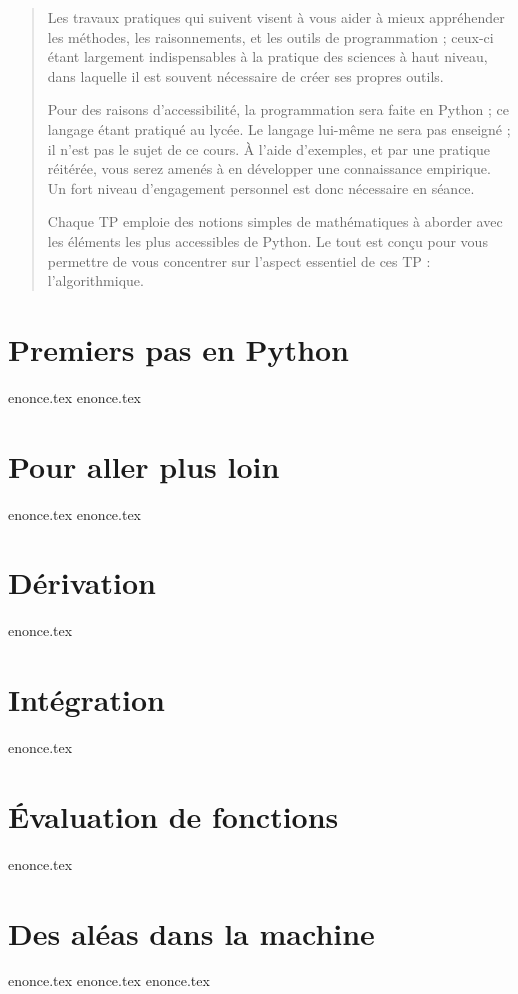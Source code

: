 \documentclass[a4paper,11pt,titlepage]{article}
\begin{document}
\begin{abstract}
Les travaux pratiques qui suivent visent à vous aider à mieux appréhender 
les méthodes, les raisonnements, et les outils de programmation ;
ceux-ci étant largement indispensables à la pratique des sciences à
haut niveau, dans laquelle il est souvent nécessaire
de créer ses propres outils.

Pour des raisons d'accessibilité, la programmation sera faite en Python ;
ce langage étant pratiqué au lycée. Le langage lui-même ne sera pas enseigné ;
il n'est pas le sujet de ce cours.
À l'aide d'exemples, et par une pratique réitérée,
vous serez amenés à en développer une connaissance empirique.
Un fort niveau d'engagement personnel est donc nécessaire en séance.

Chaque TP emploie des notions simples de mathématiques à aborder avec
les éléments les plus accessibles de Python. Le tout est conçu pour vous
permettre de vous concentrer sur l'aspect essentiel de ces TP :
l'algorithmique. 
  
\end{abstract}






\pagebreak
\section{Premiers pas en Python}
{enonce.tex}
\pagebreak
{enonce.tex}

\pagebreak
\section{Pour aller plus loin}
{enonce.tex}
{enonce.tex}
\pagebreak
\section{Dérivation}
{enonce.tex}
\FloatBarrier
\pagebreak

\section{Intégration}
{enonce.tex}
\pagebreak
\section{Évaluation de fonctions}
{enonce.tex}
\pagebreak
\section{Des aléas dans la machine}
{enonce.tex}
\pagebreak
{enonce.tex}
\pagebreak
{enonce.tex}
\end{document}
